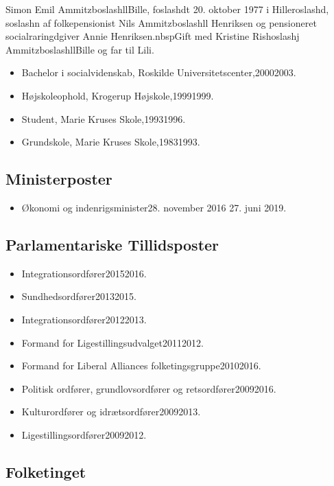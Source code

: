 \documentclass[11pt, a4paper]{awesome-cv}
\begin{document}
\makecvheader[R]
\makelettertitle
\begin{cvletter}
Simon Emil AmmitzboslashllBille, foslashdt 20. oktober 1977 i Hilleroslashd, soslashn af folkepensionist Nils Ammitzboslashll Henriksen og pensioneret socialraringdgiver Annie Henriksen.nbspGift med Kristine Rishoslashj AmmitzboslashllBille og far til Lili.

\begin{itemize}
\item Bachelor i socialvidenskab, Roskilde Universitetscenter,20002003.
\item Højskoleophold, Krogerup Højskole,19991999.
\item Student, Marie Kruses Skole,19931996.
\item Grundskole, Marie Kruses Skole,19831993.
\end{itemize}
\subsection*{Ministerposter}
\begin{itemize}
\item Økonomi og indenrigsminister28. november 2016  27. juni 2019.
\end{itemize}
\subsection*{Parlamentariske Tillidsposter}
\begin{itemize}
\item Integrationsordfører20152016.
\item Sundhedsordfører20132015.
\item Integrationsordfører20122013.
\item Formand for Ligestillingsudvalget20112012.
\item Formand for Liberal Alliances folketingsgruppe20102016.
\item Politisk ordfører, grundlovsordfører og retsordfører20092016.
\item Kulturordfører og idrætsordfører20092013.
\item Ligestillingsordfører20092012.
\end{itemize}
\subsection*{Folketinget}

\end{cvletter}
\end{document}
